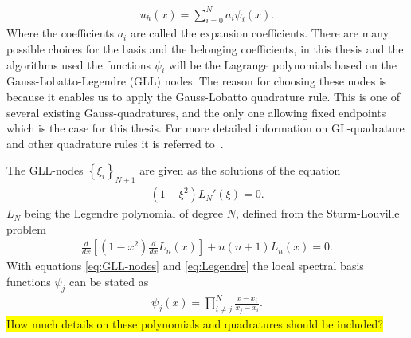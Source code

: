 \begin{align}
    u_h(x) = \sum_{i=0}^N a_i\psi_i(x).
    \label{eq:spectralprojection}
\end{align}
Where the coefficients $a_i$ are called the expansion coefficients. There are many possible choices for the basis and the belonging coefficients, 
in this thesis and the algorithms used the functions $\psi_i$ will be the Lagrange polynomials based on the Gauss-Lobatto-Legendre (GLL) nodes. 
The reason for choosing these nodes is because it enables us to apply the Gauss-Lobatto quadrature 
rule. This is one of several existing Gauss-quadratures, and the only one allowing fixed 
endpoints which is the case for this thesis. For more detailed information on GL-quadrature and 
other quadrature rules it is referred to~\cite{SM}.

The GLL-nodes $\left\{ \xi_i \right\}_{N+1}$ are given as the solutions of the equation 
\begin{align}
    (1-\xi^2)L_N'(\xi) = 0.
    \label{eq:GLL-nodes}
\end{align}
$L_N$ being the Legendre polynomial of degree $N$, defined from the Sturm-Louville problem
\begin{align}
    \frac{d}{dx}\left[  (1-x^2)\frac{d}{dx}L_n(x)\right]+n(n+1)L_n(x) = 0.
    \label{eq:Legendre}
\end{align}
With equations \ref{eq:GLL-nodes} and \ref{eq:Legendre} the local spectral 
basis functions $\psi_j$ can be stated as 
\begin{align}
    \psi_j(x) = \prod_{i\neq j}^{N}\frac{x-x_i}{x_j-x_i}.
    \label{eq:Lagrange}
\end{align}
\colorbox{yellow}{How much details on these polynomials and quadratures should be included? }

